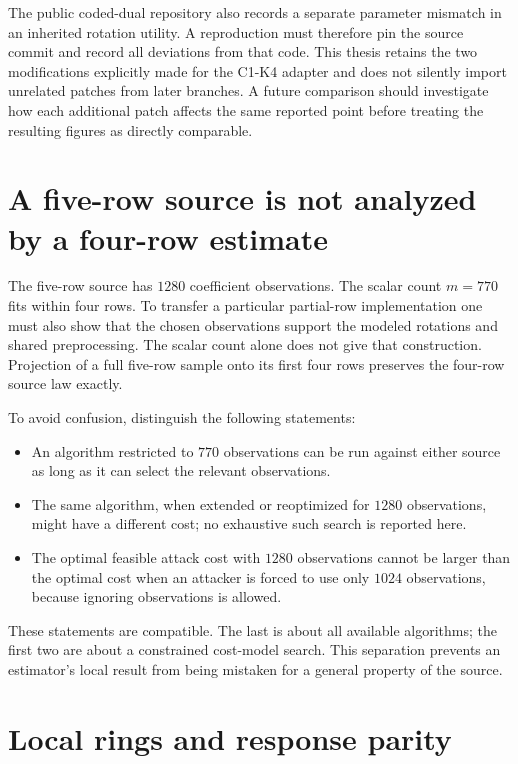\documentclass[
  11pt,
  a4paper,
  oneside]{report}
\providecommand{\tightlist}{%
  \setlength{\itemsep}{0pt}\setlength{\parskip}{0pt}}
\begin{document}
The public coded-dual repository also records a separate parameter
mismatch in an inherited rotation utility. A reproduction must therefore
pin the source commit and record all deviations from that code. This
thesis retains the two modifications explicitly made for the C1-K4
adapter and does not silently import unrelated patches from later
branches. A future comparison should investigate how each additional
patch affects the same reported point before treating the resulting
figures as directly comparable.

\section{A five-row source is not analyzed by a four-row
estimate}\label{a-five-row-source-is-not-analyzed-by-a-four-row-estimate}

The five-row source has \(1280\) coefficient observations. The scalar
count \(m=770\) fits within four rows. To transfer a particular
partial-row implementation one must also show that the chosen
observations support the modeled rotations and shared preprocessing. The
scalar count alone does not give that construction. Projection of a full
five-row sample onto its first four rows preserves the four-row source
law exactly.

To avoid confusion, distinguish the following statements:

\begin{itemize}
\tightlist
\item
  An algorithm restricted to \(770\) observations can be run against
  either source as long as it can select the relevant observations.
\item
  The same algorithm, when extended or reoptimized for \(1280\)
  observations, might have a different cost; no exhaustive such search
  is reported here.
\item
  The optimal feasible attack cost with \(1280\) observations cannot be
  larger than the optimal cost when an attacker is forced to use only
  \(1024\) observations, because ignoring observations is allowed.
\end{itemize}

These statements are compatible. The last is about all available
algorithms; the first two are about a constrained cost-model search.
This separation prevents an estimator's local result from being mistaken
for a general property of the source.

\section{Local rings and response
parity}\label{local-rings-and-response-parity}
\end{document}
